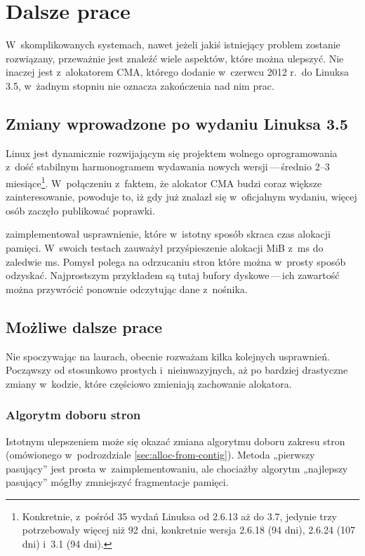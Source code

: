 \chapter{Dalsze prace}

W~skomplikowanych systemach, nawet jeżeli jakiś istniejący problem
zostanie rozwiązany, przeważnie jest znaleźć wiele aspektów, które
można ulepszyć.  Nie inaczej jest z~alokatorem CMA, którego dodanie
w~czerwcu 2012 r.\ do Linuksa 3.5, w~żadnym stopniu nie oznacza
zakończenia nad nim prac.

\section{Zmiany wprowadzone po wydaniu Linuksa 3.5}

Linux jest dynamicznie rozwijającym się projektem wolnego
oprogramowania z~dość stabilnym harmonogramem wydawania nowych
wersji\,---\,średnio 2--3 miesiące\footnote{Konkretnie, z~pośród 35
  wydań Linuksa od 2.6.13 aż do 3.7, jedynie trzy potrzebowały więcej
  niż 92 dni, konkretnie wersja 2.6.18 (94 dni), 2.6.24 (107 dni)
  i~3.1 (94 dni).}.  W~połączeniu z~faktem, że alokator CMA budzi
coraz większe zainteresowanie, powoduje to, iż gdy już znalazł się
w~oficjalnym wydaniu, więcej osób zaczęło publikować poprawki.

\textcite{patch:cma-discard} zaimplementował usprawnienie, które
w~istotny sposób skraca czas alokacji pamięci.  W~swoich testach
zauważył przyśpieszenie alokacji \unit[10]{MiB} z~\unit[146]{ms} do
zaledwie \unit[7]{ms}.  Pomysł polega na odrzucaniu stron które można
w~prosty sposób odzyskać.  Najprostszym przykładem są tutaj bufory
dyskowe\,---\,ich zawartość można przywrócić ponownie odczytując dane
z~nośnika.

\section{Możliwe dalsze prace}

Nie spoczywając na laurach, obecnie rozważam kilka kolejnych
usprawnień.  Począwszy od stosunkowo prostych i~nieinwazyjnych, aż po
bardziej drastyczne zmiany w~kodzie, które częściowo zmieniają
zachowanie alokatora.

\subsection{Algorytm doboru stron}

Istotnym ulepszeniem może się okazać zmiana algorytmu doboru zakresu
stron (omówionego w~podrozdziale \ref{sec:alloc-from-contig}).  Metoda
„pierwszy pasujący” jest prosta w~zaimplementowaniu, ale chociażby
algorytm „najlepszy pasujący” mógłby zmniejszyć fragmentacje pamięci.

